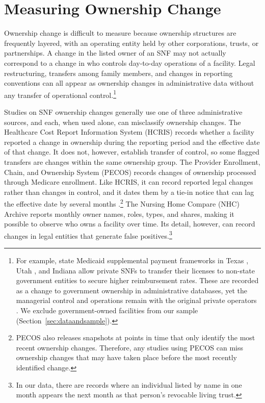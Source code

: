 \documentclass[12pt]{article}
\begin{document}
\section{Measuring Ownership Change} \label{sec:measuring-ownership}

Ownership change is difficult to measure because ownership structures are frequently layered, with an operating entity held by other corporations, trusts, or partnerships. A change in the listed owner of an SNF may not actually correspond to a change in who controls day-to-day operations of a facility. Legal restructuring, transfers among family members, and changes in reporting conventions can all appear as ownership changes in administrative data without any transfer of operational control.\footnote{For example, state Medicaid supplemental payment frameworks in Texas \citep{tex_admin_code_353_1302}, Utah \citep{utah_admin_code_r414_505_5}, and Indiana \citep{ind_code_12_15_14} allow private SNFs to transfer their licenses to non-state government entities to secure higher reimbursement rates. These are recorded as a change to government ownership in administrative databases, yet the managerial control and operations remain with the original private operators \citep{utah_auditor_2026_snf_upl, kffhn_2017_indiana_nh, kxan_2021_qipp}. We exclude government-owned facilities from our sample (Section~\ref{sec:dataandsample}).}

Studies on SNF ownership changes generally use one of three administrative sources, and each, when used alone, can misclassify ownership changes. The Healthcare Cost Report Information System (HCRIS) records whether a facility reported a change in ownership during the reporting period and the effective date of that change. It does not, however, establish transfer of control, so some flagged transfers are changes within the same ownership group. The Provider Enrollment, Chain, and Ownership System (PECOS) records changes of ownership processed through Medicare enrollment. Like HCRIS, it can record reported legal changes rather than changes in control, and it dates them by a tie-in notice that can lag the effective date by several months \citep{CMS2022SNFCHOWGuidance}.\footnote{PECOS also releases snapshots at points in time that only identify the most recent ownership changes. Therefore, any studies using PECOS \citep[e.g.,][]{prusynski_et_al_2025, StevensonEtAl2023, OliveiraBlanco2024} can miss ownership changes that may have taken place before the most recently identified change.} The Nursing Home Compare (NHC) Archive reports monthly owner names, roles, types, and shares, making it possible to observe who owns a facility over time. Its detail, however, can record changes in legal entities that generate false positives.\footnote{In our data, there are records where an individual listed by name in one month appears the next month as that person's revocable living trust.}
\end{document}

